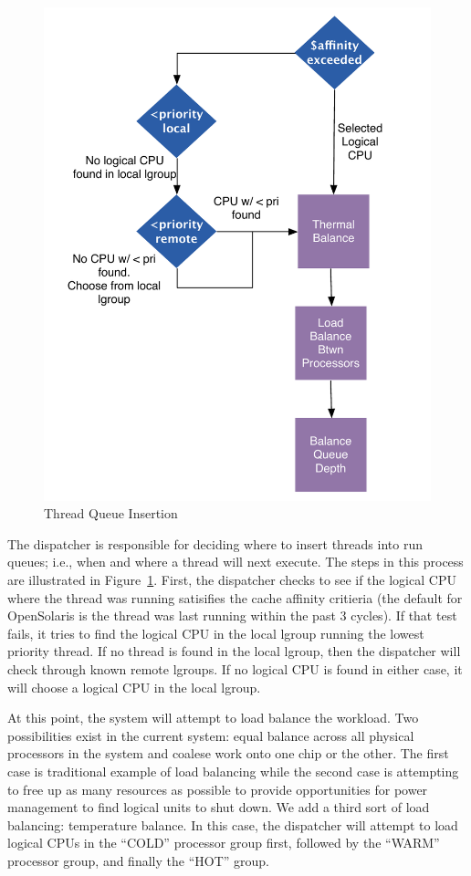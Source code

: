 \documentclass[times,12pt,onecolumn]{article}
\begin{document}
\begin{figure}[htbp]
  \centering
  \includegraphics[scale=0.40]{threadinsert.pdf}
  \caption{Thread Queue Insertion}
  \label{fig:thread}
\end{figure}
The dispatcher is responsible for deciding where to insert threads into
run queues; i.e., when and where a thread will next execute. The steps
in this process are illustrated in Figure~\ref{fig:thread}.  First, the
dispatcher checks to see if the logical CPU where the thread was running
satisifies the cache affinity critieria (the default for OpenSolaris is
the thread was last running within the past 3 cycles).  If that test
fails, it tries to find the logical CPU in the local lgroup running the
lowest priority thread.  If no thread is found in the local lgroup, then
the dispatcher will check through known remote lgroups.  If no logical
CPU is found in either case, it will choose a logical CPU in the local
lgroup.

At this point, the system will attempt to load balance the workload.
Two possibilities exist in the current system: equal balance across all
physical processors in the system and coalese work onto one chip or the
other.  The first case is traditional example of load balancing while
the second case is attempting to free up as many resources as possible
to provide opportunities for power management to find logical units to
shut down.   We add a third sort of load balancing: temperature
balance. In this case, the dispatcher will attempt to load logical CPUs
in the ``COLD'' processor group first, followed by the ``WARM''
processor group, and finally the ``HOT'' group.
\end{document}
